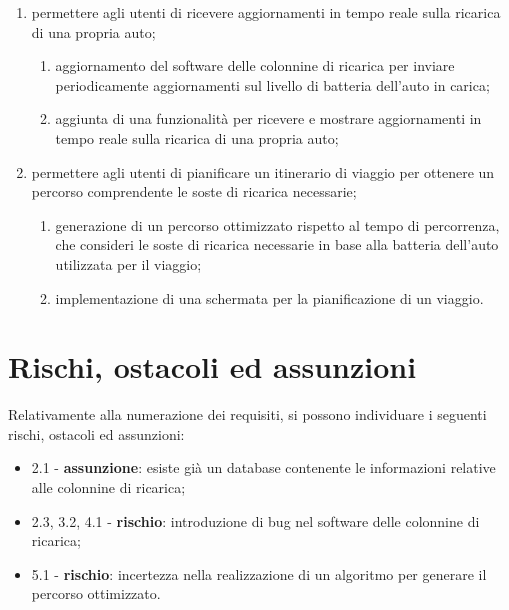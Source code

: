 \documentclass[a4paper,12pt]{article}
\begin{document}
\begin{enumerate}
    registrata;
    \begin{enumerate}
        \item aggiunta della nozione di ricarica nei dati dei database;
        \item aggiornamento del software delle colonnine di ricarica per associare con l'applicazione una ricarica ad
        un'auto registrata;
        \item aggiunta di una funzionalità per avviare una ricarica associando un'auto registrata ad una colonnina di ricarica;
    \end{enumerate}
    \item permettere agli utenti di ricevere aggiornamenti in tempo reale sulla ricarica di una propria auto;
    \begin{enumerate}
        \item aggiornamento del software delle colonnine di ricarica per inviare periodicamente aggiornamenti sul
        livello di batteria dell'auto in carica;
        \item aggiunta di una funzionalità per ricevere e mostrare aggiornamenti in tempo reale sulla ricarica di una propria auto;
    \end{enumerate}
    \item permettere agli utenti di pianificare un itinerario di viaggio per ottenere un percorso comprendente le soste
    di ricarica necessarie;
    \begin{enumerate}
        \item generazione di un percorso ottimizzato rispetto al tempo di percorrenza, che consideri le soste di ricarica
        necessarie in base alla batteria dell'auto utilizzata per il viaggio;
        \item implementazione di una schermata per la pianificazione di un viaggio.
    \end{enumerate}
\end{enumerate}

\section*{Rischi, ostacoli ed assunzioni}
Relativamente alla numerazione dei requisiti, si possono individuare i seguenti rischi, ostacoli ed assunzioni:
\begin{itemize}
    \item 2.1 - \textbf{assunzione}: esiste già un database contenente le informazioni relative alle colonnine di ricarica;
    \item 2.3, 3.2, 4.1 - \textbf{rischio}: introduzione di bug nel software delle colonnine di ricarica;
    \item 5.1 - \textbf{rischio}: incertezza nella realizzazione di un algoritmo per generare il percorso ottimizzato.
\end{itemize}
\end{document}
